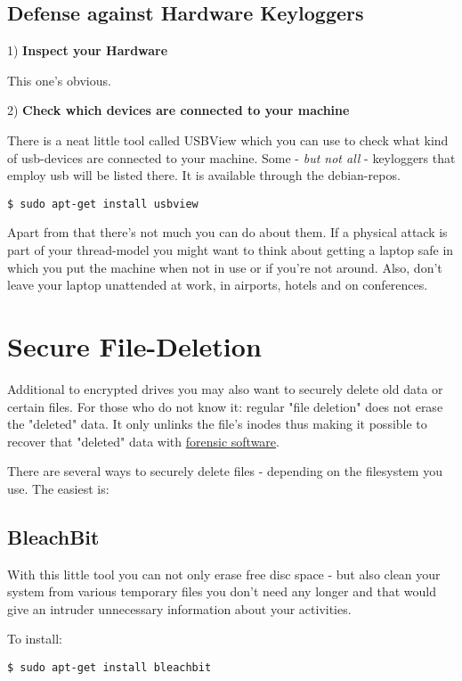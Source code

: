 \documentclass{article}
\begin{document}
\subsection{Defense against Hardware Keyloggers}


 1) \textbf{Inspect your Hardware}


 This one's obvious. 


 2) \textbf{Check which devices are connected to your machine}


 There is a neat little tool called USBView which you can use to check what kind of usb-devices are connected to your machine. Some - \emph{but not all} - keyloggers that employ usb will be listed there. It is available through the debian-repos. 
\begin{lstlisting}
$ sudo apt-get install usbview
\end{lstlisting}



 Apart from that there's not much you can do about them. If a physical attack is part of your thread-model you might want to think about getting a laptop safe in which you put the machine when not in use or if you're not around. Also, don't leave your laptop unattended at work, in airports, hotels and on conferences.
\section{Secure File-Deletion}


 Additional to encrypted drives you may also want to securely delete old data or certain files. For those who do not know it: regular "file deletion" does not erase the "deleted" data. It only unlinks the file's inodes thus making it possible to recover that "deleted" data with \href{http://www.sleuthkit.org}{forensic software}. 


 There are several ways to securely delete files - depending on the filesystem you use. The easiest is:
\subsection{BleachBit}


 With this little tool you can not only erase free disc space - but also clean your system from various temporary files you don't need any longer and that would give an intruder unnecessary information about your activities.


 To install:
\begin{lstlisting}
$ sudo apt-get install bleachbit
\end{lstlisting}
\end{document}

